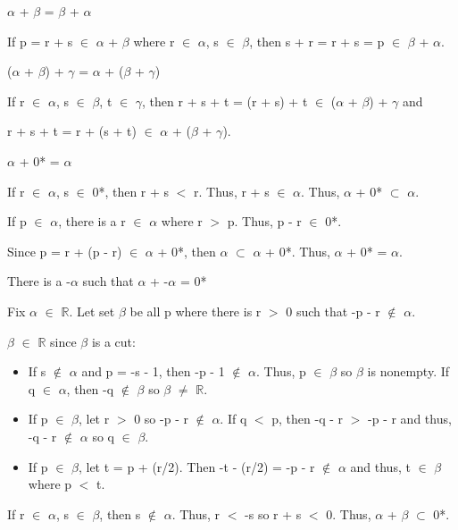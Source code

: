 \begin{adjustbox}{minipage=14cm, right, vspace=0.1cm 0cm}
		$\alpha$ + $\beta$ = $\beta$ + $\alpha$

			\qquad If p = r + s $\in$ $\alpha$ + $\beta$ where
			r $\in$ $\alpha$, s $\in$ $\beta$, then s + r = r + s = p $\in$ $\beta$ + $\alpha$.

		($\alpha$ + $\beta$) + $\gamma$  = $\alpha$ + ($\beta$ + $\gamma$)

			\qquad If r $\in$ $\alpha$, s $\in$ $\beta$, t $\in$ $\gamma$, then
			r + s + t = (r + s) + t $\in$ ($\alpha$ + $\beta$) + $\gamma$ and

			\qquad r + s + t = r + (s + t) $\in$ $\alpha$ + ($\beta$ + $\gamma$).

		$\alpha$ + 0* = $\alpha$

			\qquad If r $\in$ $\alpha$, s $\in$ 0*, then r + s $<$ r. Thus, r + s $\in$ $\alpha$.
			Thus, $\alpha$ + 0* $\subset$ $\alpha$.

			\qquad If p $\in$ $\alpha$, there is a r $\in$ $\alpha$ where r $>$ p.
			Thus, p - r $\in$ 0*.

			\qquad Since p = r + (p - r) $\in$ $\alpha$ + 0*, then $\alpha$ $\subset$ $\alpha$ + 0*.
			Thus, $\alpha$ + 0* = $\alpha$.

		There is a -$\alpha$ such that $\alpha$ + -$\alpha$ = 0*

			\qquad Fix $\alpha$ $\in$ $\mathbb{R}$. Let set $\beta$ be all p where
			there is r $>$ 0 such that -p - r $\not \in$ $\alpha$.

			\qquad $\beta$ $\in$ $\mathbb{R}$ since $\beta$ is a cut:

			\begin{itemize}[leftmargin=2cm, itemsep=0.4em]
				\item If s $\not \in$ $\alpha$ and p = -s - 1, then -p - 1 $\not \in$ $\alpha$.
					Thus, p $\in$ $\beta$ so $\beta$ is nonempty.
					If q $\in$ $\alpha$, then -q $\not \in$ $\beta$ so $\beta$ $\neq$ $\mathbb{R}$.

				\item If p $\in$ $\beta$, let r $>$ 0 so -p - r $\not \in$ $\alpha$.
					If q $<$ p, then -q - r $>$ -p - r and thus, -q - r $\not \in$ $\alpha$
					so q $\in$ $\beta$.

				\item If p $\in$ $\beta$, let t = p + (r/2). Then
					-t - (r/2) = -p - r $\not \in$ $\alpha$ and thus, t $\in$ $\beta$
					where p $<$ t.
			\end{itemize}
			
			\qquad If r $\in$ $\alpha$, s $\in$ $\beta$, then s $\not \in$ $\alpha$. Thus,
			r $<$ -s so r + s $<$ 0. Thus, $\alpha$ + $\beta$ $\subset$ 0*.


\end{adjustbox}
